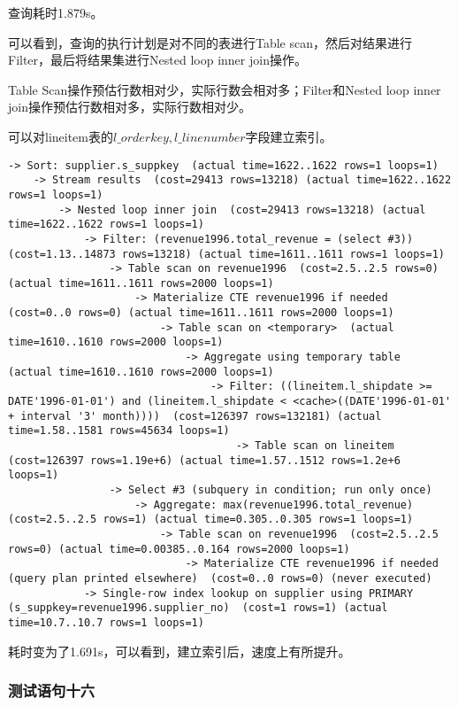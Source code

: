 \documentclass{article}
\begin{document}
查询耗时1.879s。

可以看到，查询的执行计划是对不同的表进行Table scan，然后对结果进行Filter，最后将结果集进行Nested loop inner join操作。

Table Scan操作预估行数相对少，实际行数会相对多；Filter和Nested loop inner join操作预估行数相对多，实际行数相对少。

可以对lineitem表的$l\_orderkey,l\_linenumber$字段建立索引。

\begin{lstlisting}
-> Sort: supplier.s_suppkey  (actual time=1622..1622 rows=1 loops=1)
    -> Stream results  (cost=29413 rows=13218) (actual time=1622..1622 rows=1 loops=1)
        -> Nested loop inner join  (cost=29413 rows=13218) (actual time=1622..1622 rows=1 loops=1)
            -> Filter: (revenue1996.total_revenue = (select #3))  (cost=1.13..14873 rows=13218) (actual time=1611..1611 rows=1 loops=1)
                -> Table scan on revenue1996  (cost=2.5..2.5 rows=0) (actual time=1611..1611 rows=2000 loops=1)
                    -> Materialize CTE revenue1996 if needed  (cost=0..0 rows=0) (actual time=1611..1611 rows=2000 loops=1)
                        -> Table scan on <temporary>  (actual time=1610..1610 rows=2000 loops=1)
                            -> Aggregate using temporary table  (actual time=1610..1610 rows=2000 loops=1)
                                -> Filter: ((lineitem.l_shipdate >= DATE'1996-01-01') and (lineitem.l_shipdate < <cache>((DATE'1996-01-01' + interval '3' month))))  (cost=126397 rows=132181) (actual time=1.58..1581 rows=45634 loops=1)
                                    -> Table scan on lineitem  (cost=126397 rows=1.19e+6) (actual time=1.57..1512 rows=1.2e+6 loops=1)
                -> Select #3 (subquery in condition; run only once)
                    -> Aggregate: max(revenue1996.total_revenue)  (cost=2.5..2.5 rows=1) (actual time=0.305..0.305 rows=1 loops=1)
                        -> Table scan on revenue1996  (cost=2.5..2.5 rows=0) (actual time=0.00385..0.164 rows=2000 loops=1)
                            -> Materialize CTE revenue1996 if needed (query plan printed elsewhere)  (cost=0..0 rows=0) (never executed)
            -> Single-row index lookup on supplier using PRIMARY (s_suppkey=revenue1996.supplier_no)  (cost=1 rows=1) (actual time=10.7..10.7 rows=1 loops=1)
\end{lstlisting}

耗时变为了1.691s，可以看到，建立索引后，速度上有所提升。

\subsubsection{测试语句十六}
\end{document}
